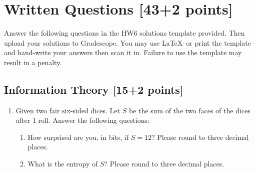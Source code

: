 \documentclass[11pt]{article}
\numberwithin{equation}{section} %
\numberwithin{figure}{section} %
\numberwithin{table}{section} %
\newcommand{\points}[1]{{\bf [#1 points]}}
\begin{document}
\clearpage
\section{Written Questions \points{43+2}}
\label{sec:warmup}
Answer the following questions in the HW6 solutions template provided.  Then upload your solutions to Gradescope. You may use \LaTeX\ or print the template and hand-write your answers then scan it in. Failure to use the template may result in a penalty.
\subsection{Information Theory [15+2 points]}
\begin{enumerate}
    \item[1] [2 points] Given two fair six-sided dices. Let $S$ be the sum of the two faces of the dices after 1 roll. Answer the following questions:
    \begin{enumerate}
        \item How surprised are you, in bits, if $S=12$? Please round to three decimal places.\\
        \begin{tcolorbox}[fit,height=1cm, width=0.5\linewidth, blank, borderline={1pt}{1pt},nobeforeafter]
        \end{tcolorbox}
        \item What is the entropy of $S$? Please round to three decimal places.\\
        \begin{tcolorbox}[fit,height=1cm, width=0.5\linewidth, blank, borderline={1pt}{1pt},nobeforeafter]
        \end{tcolorbox}
    \end{enumerate}
    

\end{enumerate}
\end{document}
